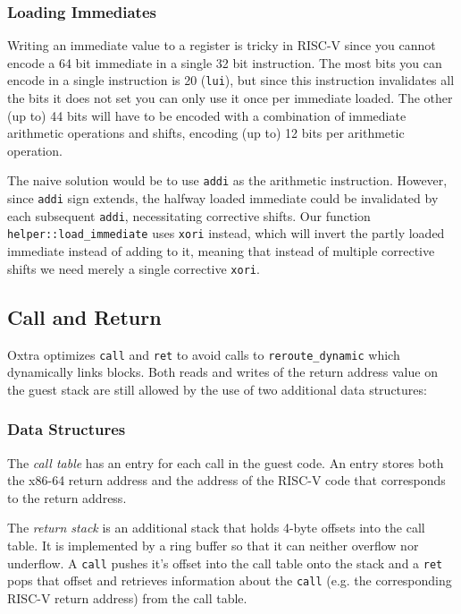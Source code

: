 	\subsubsection{Loading Immediates}
	Writing an immediate value to a register is tricky in RISC-V since you cannot encode a 64 bit immediate in a single 32 bit instruction. The most bits you can encode in a single instruction is 20 (\texttt{lui}), but since this instruction invalidates all the bits it does not set you can only use it once per immediate loaded. The other (up to) 44 bits will have to be encoded with a combination of immediate arithmetic operations and shifts, encoding (up to) 12 bits per arithmetic operation.
	
	The naive solution would be to use \texttt{addi} as the arithmetic instruction. However, since \texttt{addi} sign extends, the halfway loaded immediate could be invalidated by each subsequent \texttt{addi}, necessitating corrective shifts. Our function \texttt{helper::load\_immediate} uses \texttt{xori} instead, which will invert the partly loaded immediate instead of adding to it, meaning that instead of multiple corrective shifts we need merely a single corrective \texttt{xori}.
	
\subsection{Call and Return}
	Oxtra optimizes \texttt{call} and \texttt{ret} to avoid calls to \texttt{reroute\_dynamic} which dynamically links blocks. Both reads and writes of the return address value on the guest stack are still allowed by the use of two additional data structures:
	
	\subsubsection{Data Structures}
		The \emph{call table} has an entry for each call in the guest code. An entry stores both the x86-64 return address and the address of the RISC-V code that corresponds to the return address. 
	
		The \emph{return stack} is an additional stack that holds 4-byte offsets into the call table. It is implemented by a ring buffer so that it can neither overflow nor underflow. A \texttt{call} pushes it's offset into the call table onto the stack and a \texttt{ret} pops that offset and retrieves information about the \texttt{call} (e.g. the corresponding RISC-V return address) from the call table.

